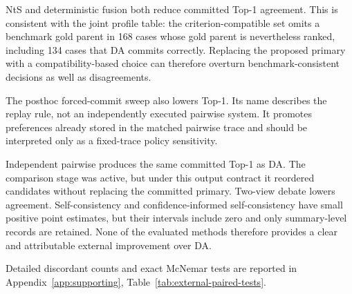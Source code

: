 NtS and deterministic fusion both reduce committed Top-1 agreement. This is consistent with the joint profile table: the criterion-compatible set omits a benchmark gold parent in 168 cases whose gold parent is nevertheless ranked, including 134 cases that DA commits correctly. Replacing the proposed primary with a compatibility-based choice can therefore overturn benchmark-consistent decisions as well as disagreements.

The posthoc forced-commit sweep also lowers Top-1. Its name describes the replay rule, not an independently executed pairwise system. It promotes preferences already stored in the matched pairwise trace and should be interpreted only as a fixed-trace policy sensitivity.

Independent pairwise produces the same committed Top-1 as DA. The comparison stage was active, but under this output contract it reordered candidates without replacing the committed primary. Two-view debate lowers agreement. Self-consistency and confidence-informed self-consistency have small positive point estimates, but their intervals include zero and only summary-level records are retained. None of the evaluated methods therefore provides a clear and attributable external improvement over DA.

Detailed discordant counts and exact McNemar tests are reported in Appendix~\ref{app:supporting}, Table~\ref{tab:external-paired-tests}.

